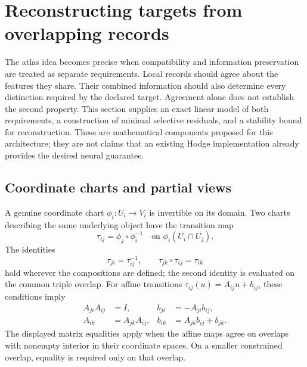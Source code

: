 \section{Reconstructing targets from overlapping records}
\label{atl:section}

The atlas idea becomes precise when compatibility and information preservation
are treated as separate requirements. Local records should agree about the
features they share. Their combined information should also determine every
distinction required by the declared target. Agreement alone does not establish
the second property. This section supplies an exact linear model of both
requirements, a construction of minimal selective residuals, and a stability
bound for reconstruction. These are mathematical components proposed for this
architecture; they are not claims that an existing Hodge implementation already
provides the desired neural guarantee.

\subsection{Coordinate charts and partial views}
\label{atl:charts}

A genuine coordinate chart $\phi_i:U_i\to V_i$ is invertible on its domain.
Two charts describing the same underlying object have the transition map
\begin{equation}
  \tau_{ij}=\phi_j\circ\phi_i^{-1}
  \quad\text{on }\phi_i(U_i\cap U_j).
  \label{atl:transition}
\end{equation}
The identities
\begin{equation}
  \tau_{ji}=\tau_{ij}^{-1},
  \qquad
  \tau_{jk}\circ\tau_{ij}=\tau_{ik}
  \label{atl:cocycle}
\end{equation}
hold wherever the compositions are defined; the second identity is evaluated
on the common triple overlap. For affine transitions
$\tau_{ij}(u)=A_{ij}u+b_{ij}$, these conditions imply
\begin{align}
  A_{ji}A_{ij}&=I,
  & b_{ji}&=-A_{ji}b_{ij}, \nonumber\\
  A_{ik}&=A_{jk}A_{ij},
  & b_{ik}&=A_{jk}b_{ij}+b_{jk}.
  \label{atl:affine-cocycle}
\end{align}
The displayed matrix equalities apply when the affine maps agree on overlaps
with nonempty interior in their coordinate spaces. On a smaller constrained
overlap, equality is required only on that overlap.

